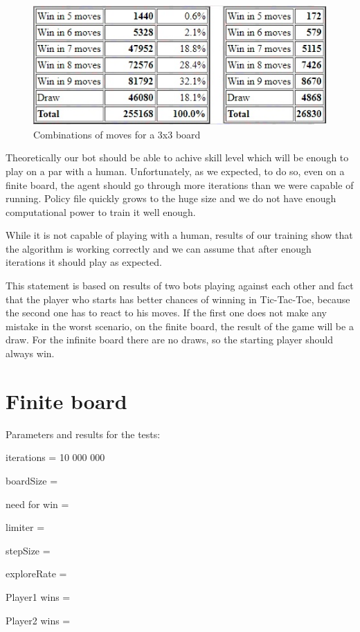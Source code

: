 \documentclass[a4paper,12pt]{book}
\begin{document}
\begin{figure}[!h]
\includegraphics{./Images/3x3moves.jpg}
	\centering
	\caption{Combinations of moves for a 3x3 board\protect\footnotemark}
	\label{fig:Capture1}
\end{figure}

Theoretically our bot should be able to achive skill level which will be enough to play on a par with a human. Unfortunately, as we expected, to do so, even on a finite board, the agent should go through more iterations than we were capable of running. Policy file quickly grows to the huge size and we do not have enough computational power to train it well enough.

While it is not capable of playing with a human, results of our training show that the algorithm is working correctly and we can assume that after enough iterations it should play as expected. 

This statement is based on results of two bots playing against each other and fact that the player who starts has better chances of winning in Tic-Tac-Toe, because the second one has to react to his moves. If the first one does not make any mistake in the worst scenario, on the finite board, the result of the game will be a draw. For the infinite board there are no draws, so the starting player should always win.

 	\section{Finite board}

Parameters and results for the tests:

\begin{description}
	\item iterations = 10 000 000
	\item boardSize = 
	\item need for win = 
	\item limiter = 
	\item stepSize = 
	\item exploreRate = 
	\item Player1 wins = 
	\item Player2 wins = 
\end{description}
\end{document}
